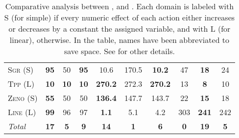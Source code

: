 \documentclass[11pt]{article}
\begin{document}
\begin{table*}[tb]
{\begin{tabular}{|l||ccc||ccc||ccc||}
\textsc{Sgr} (S)&\textbf{95}&50&\textbf{95}&10.6&170.5&\textbf{10.2}&47&\textbf{18}&24\\
\textsc{Tpp} (L)&\textbf{10}&\textbf{10}&\textbf{10}&\textbf{270.2}&272.3&\textbf{270.2}&13&\textbf{8}&10\\
\textsc{Zeno} (S)&\textbf{55}&50&50&\textbf{136.4}&147.7&143.7&22&\textbf{15}&18\\
\textsc{Line} (L)&\textbf{99}&96&97&\textbf{1.1}&5.1&4.2&303&\textbf{241}&242
\\\hline
\textit{Total}&\textbf{17}&\textbf{5}&\textbf{9}&\textbf{14}&\textbf{1}&\textbf{6}&\textbf{0}&\textbf{19}&\textbf{5}\\\hline

        \end{tabular}}
        \caption{Comparative analysis between  \pattye, \pattym and \pattyi. Each domain is labeled with S (for simple) if every numeric effect of each action either increases or decreases by a constant the assigned variable, and with L (for linear), otherwise. In the table, names have been abbreviated to save space.  See \cite{ipc2023} for other details.}
        \label{tab:qual-plans}
        \end{table*}
        
\end{document}
